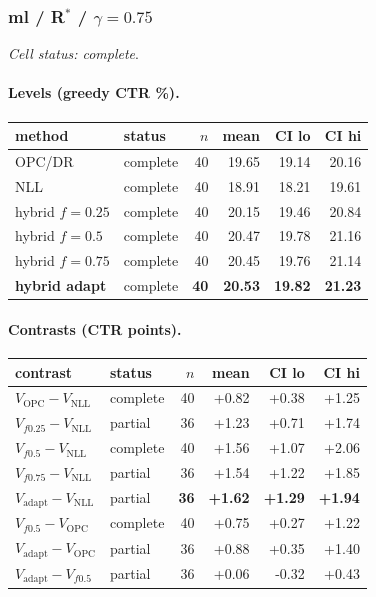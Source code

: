 \documentclass[10pt,a4paper]{article}
\begin{document}
\subsubsection{ml / R$^*$ / $\gamma=0.75$}
\emph{Cell status: complete}.
\paragraph{Levels (greedy CTR \%).}
{\centering\small\begin{tabular}{llrrrr}
\toprule method & status & $n$ & mean & CI lo & CI hi \\
\midrule
OPC/DR & complete & 40 & 19.65 & 19.14 & 20.16 \\
NLL & complete & 40 & 18.91 & 18.21 & 19.61 \\
hybrid $f{=}0.25$ & complete & 40 & 20.15 & 19.46 & 20.84 \\
hybrid $f{=}0.5$ & complete & 40 & 20.47 & 19.78 & 21.16 \\
hybrid $f{=}0.75$ & complete & 40 & 20.45 & 19.76 & 21.14 \\
\textbf{hybrid adapt} & complete & \textbf{40} & \textbf{20.53} & \textbf{19.82} & \textbf{21.23} \\
\bottomrule\end{tabular}\par}
\paragraph{Contrasts (CTR points).}
{\centering\small\begin{tabular}{llrrrr}
\toprule contrast & status & $n$ & mean & CI lo & CI hi \\
\midrule
$V_{\mathrm{OPC}}-V_{\mathrm{NLL}}$ & complete & 40 & +0.82 & +0.38 & +1.25 \\
$V_{f0.25}-V_{\mathrm{NLL}}$ & partial & 36 & +1.23 & +0.71 & +1.74 \\
$V_{f0.5}-V_{\mathrm{NLL}}$ & complete & 40 & +1.56 & +1.07 & +2.06 \\
$V_{f0.75}-V_{\mathrm{NLL}}$ & partial & 36 & +1.54 & +1.22 & +1.85 \\
\textbf{$V_{\mathrm{adapt}}-V_{\mathrm{NLL}}$} & partial & \textbf{36} & \textbf{+1.62} & \textbf{+1.29} & \textbf{+1.94} \\
$V_{f0.5}-V_{\mathrm{OPC}}$ & complete & 40 & +0.75 & +0.27 & +1.22 \\
$V_{\mathrm{adapt}}-V_{\mathrm{OPC}}$ & partial & 36 & +0.88 & +0.35 & +1.40 \\
$V_{\mathrm{adapt}}-V_{f0.5}$ & partial & 36 & +0.06 & -0.32 & +0.43 \\
\bottomrule\end{tabular}\par}
\end{document}

